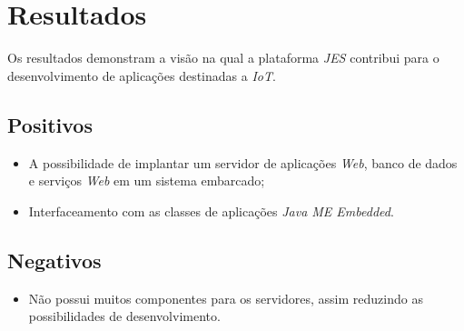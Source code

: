 \newpage
\section{Resultados}

Os resultados demonstram a visão na qual a plataforma \textit{JES} contribui
para o desenvolvimento de aplicações destinadas a \textit{IoT}.

\subsection{Positivos}

\begin{itemize}

    \item A possibilidade de implantar um servidor de aplicações \textit{Web},
    banco de dados e serviços \textit{Web} em um sistema embarcado;

    \item Interfaceamento com as classes de aplicações \textit{Java ME
        Embedded}.

\end{itemize}

\subsection{Negativos}

\begin{itemize}

    \item Não possui muitos componentes para os servidores, assim reduzindo as
    possibilidades de desenvolvimento.

\end{itemize}
